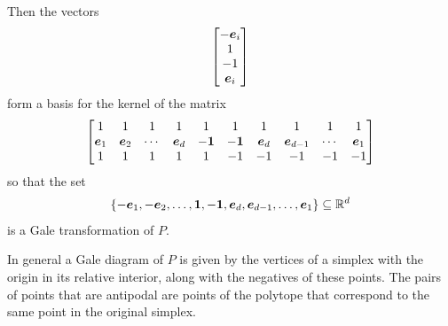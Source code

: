     Then the vectors
        \begin{align*}
                \begin{bmatrix}
                    -\bm{e}_i     \\
                    1           \\
                    -1          \\
                    \bm{e}_i
                \end{bmatrix}
        \end{align*}
    form a basis for the kernel of the matrix
        \begin{align*}
            \begin{bmatrix}
                1           &   1           &   1           &   1           &   1           &
                1           &   1           &   1           &   1           &   1           \\
                \bm{e}_1     &   \bm{e}_2     &   \cdots      &   \bm{e}_d     &   -\bm{1}       &
                -\bm{1}       &   \bm{e}_d     &   \bm{e}_{d-1} &   \cdots      &   \bm{e}_1     \\
                1           &   1           &   1           &   1           &   1           &
                -1          &   -1          &   -1          &   -1          &   -1          \\
            \end{bmatrix}
        \end{align*}
    so that the set
        \begin{align*}
            \left\{
            -\bm{e}_1, -\bm{e}_2,\dotsc, \bm{1}, -\bm{1},\bm{e}_d,\bm{e}_{d-1},\dotsc,\bm{e}_1
            \right\}\subseteq\mathbb{R}^{d}
        \end{align*}
    is a Gale transformation of \(P\).

    In general a Gale diagram of \(P\) is given by the vertices of a simplex with the origin in its relative interior, along with the negatives of these points.  The pairs of points that are antipodal are points of the polytope that correspond to the same point in the original simplex.

